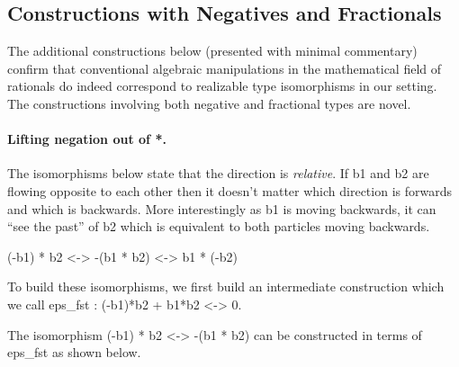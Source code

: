 \documentclass[preprint]{sigplanconf}
\begin{document}
\subsection{Constructions with Negatives and Fractionals}
\label{sec:specific-constructions}

The additional constructions below (presented with minimal commentary)
confirm that conventional algebraic manipulations in the mathematical field
of rationals do indeed correspond to realizable type isomorphisms in our
setting. The constructions involving both negative and fractional types are
novel.

\paragraph*{Lifting negation out of {{*}}.}
The isomorphisms below state that the direction is \emph{relative}. If {{b1}}
and {{b2}} are flowing opposite to each other then it doesn't matter which
direction is forwards and which is backwards. More interestingly as {{b1}} is
moving backwards, it can ``see the past'' of {{b2}} which is equivalent to
both particles moving backwards.

{{(-b1) * b2 <-> -(b1 * b2) <-> b1 * (-b2)}}

To build these isomorphisms, we first build an intermediate
construction which we call {{eps_{fst} : (-b1)*b2 + b1*b2 <-> 0}}. 
\begin{center}
\end{center}

The isomorphism {{(-b1) * b2 <-> -(b1 * b2)}} can be constructed in
terms of {{eps_{fst} }} as shown below. 

\begin{center}
\end{center}  
\end{document}
